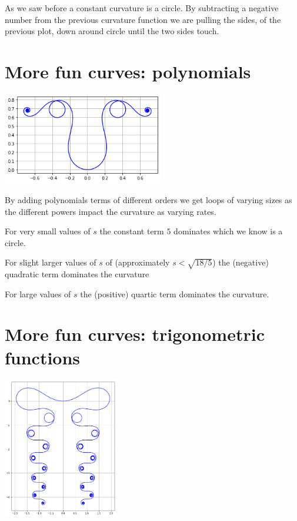 \documentclass[]{article} %
\theoremstyle{definition}
\theoremstyle{theorem}
\begin{document}
As we saw before a constant curvature is a circle. By subtracting a negative number from the previous curvature function we are pulling the sides, of the previous plot, down around circle until the two sides touch.

\section{More fun curves: polynomials}
\begin{tcolorbox}
	\begin{minipage}{\linewidth}
		\centering
		\includegraphics[width=70mm, scale=0.5]{five_s^4.png}
	\end{minipage}
\end{tcolorbox}

By adding polynomials terms of different orders we get loops of varying sizes as the different powers impact the curvature as varying rates.

For very small values of $s$ the constant term $5$ dominates which we know is a circle.

For slight larger values of $s$ of (approximately $s<\sqrt{18/5}$) the (negative) quadratic term dominates the curvature

For large values of $s$ the (positive) quartic term dominates the curvature.


\section{More fun curves: trigonometric functions}
\begin{tcolorbox}
	\begin{minipage}{\linewidth}
		\centering
		\includegraphics[width=50mm, scale=0.2]{elegant_madness.png}
	\end{minipage}
\end{tcolorbox}
\end{document}
